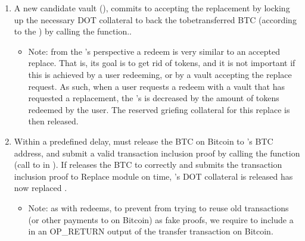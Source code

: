 \documentclass[a4paper,10pt,english]{sphinxmanual}
\begin{document}
\begin{enumerate}
\item {} 
A new candidate vault (), commits to accepting the replacement by locking up the necessary DOT collateral to back the to\sphinxhyphen{}be\sphinxhyphen{}transferred BTC (according to the ) by calling the {\hyperref[\detokenize{spec/replace:acceptreplace}]{}} function..
\begin{itemize}
\item {} 
Note: from the ’s perspective a redeem is very similar to an accepted replace. That is, its goal is to get rid of tokens, and it is not important if this is achieved by a user redeeming, or by a vault accepting the replace request. As such, when a user requests a redeem with a vault that has requested a replacement, the ’s  is decreased by the amount of tokens redeemed by the user. The reserved griefing collateral for this replace is then released.

\end{itemize}

\item {} 
Within a pre\sphinxhyphen{}defined delay,  must release the BTC on Bitcoin to ’s BTC address, and submit a valid transaction inclusion proof by calling the {\hyperref[\detokenize{spec/replace:executereplace}]{}} function (call to  in {\hyperref[\detokenize{spec/btc-relay:btc-relay}]{}}). If  releases the BTC to  correctly and submits the transaction inclusion proof to Replace module on time, ’s DOT collateral is released \sphinxhyphen{}  has now replaced .
\begin{itemize}
\item {} 
Note: as with redeems, to prevent  from trying to re\sphinxhyphen{}use old transactions (or other payments to  on Bitcoin) as fake proofs, we require  to include a  in an OP\_RETURN output of the transfer transaction on Bitcoin.


\end{itemize}
\end{enumerate}
\end{document}
